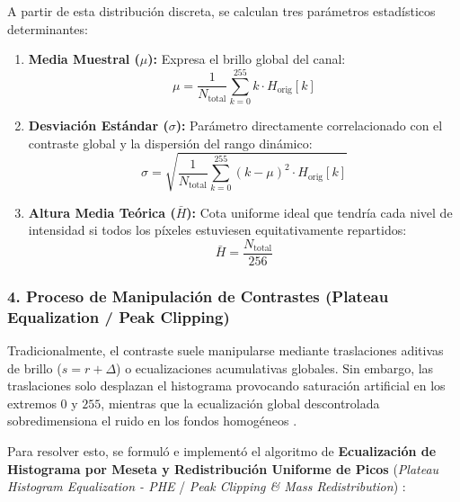 \documentclass{article}
\begin{document}
A partir de esta distribución discreta, se calculan tres parámetros estadísticos determinantes:
\begin{enumerate}
    \item \textbf{Media Muestral ($\mu$):} Expresa el brillo global del canal:
    \begin{equation}
        \mu = \frac{1}{N_{\text{total}}} \sum_{k=0}^{255} k \cdot H_{\text{orig}}[k]
    \end{equation}
    \item \textbf{Desviación Estándar ($\sigma$):} Parámetro directamente correlacionado con el contraste global y la dispersión del rango dinámico:
    \begin{equation}
        \sigma = \sqrt{\frac{1}{N_{\text{total}}} \sum_{k=0}^{255} (k - \mu)^2 \cdot H_{\text{orig}}[k]}
    \end{equation}
    \item \textbf{Altura Media Teórica ($\bar{H}$):} Cota uniforme ideal que tendría cada nivel de intensidad si todos los píxeles estuviesen equitativamente repartidos:
    \begin{equation}
        \bar{H} = \frac{N_{\text{total}}}{256}
    \end{equation}
\end{enumerate}

\subsubsection{4. Proceso de Manipulación de Contrastes (Plateau Equalization / Peak Clipping)}
Tradicionalmente, el contraste suele manipularse mediante traslaciones aditivas de brillo ($s = r + \Delta$) o ecualizaciones acumulativas globales. Sin embargo, las traslaciones solo desplazan el histograma provocando saturación artificial en los extremos $0$ y $255$, mientras que la ecualización global descontrolada sobredimensiona el ruido en los fondos homogéneos \cite{gonzalez2018digital, pratt2007digital}.

Para resolver esto, se formuló e implementó el algoritmo de \textbf{Ecualización de Histograma por Meseta y Redistribución Uniforme de Picos} (\textit{Plateau Histogram Equalization - PHE} / \textit{Peak Clipping \& Mass Redistribution}) \cite{zuiderveld1994contrast}:
\end{document}
